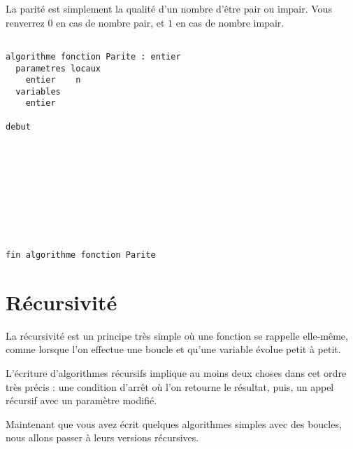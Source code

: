 \documentclass[11pt,a4paper]{article}
\begin{document}
\vfillLast


\newpage


\vfillFirst


La parité est simplement la qualité d'un nombre d'être pair ou impair.
Vous renverrez $ 0 $ en cas de nombre pair, et $ 1 $ en cas de nombre impair.

\bigskip


\begin{center}

\begin{lstlisting}[style=algorithm]

algorithme fonction Parite : entier
  parametres locaux
    entier    n
  variables
    entier    

debut










fin algorithme fonction Parite
\end{lstlisting}

\end{center}


\vfillLast

\newpage


\section{Récursivité}

\bigskip

La récursivité est un principe très simple où une fonction se rappelle elle-même, comme lorsque l'on effectue une boucle et qu'une variable évolue petit à petit.

L'écriture d'algorithmes récursifs implique au moins deux choses dans cet ordre très précis : une condition d'arrêt où l'on retourne le résultat, puis, un appel récursif avec un paramètre modifié.

\bigskip

Maintenant que vous avez écrit quelques algorithmes simples avec des boucles, nous allons passer à leurs versions récursives.

\bigskip

\end{document}
